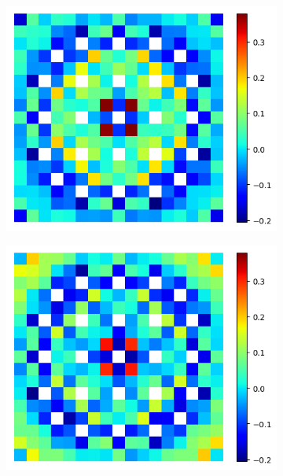 \begin{figure}[h!]
\centering
\begin{subfigure}{0.45\textwidth}
  \centering
  \includegraphics[width=\linewidth]{figures/assembly/fiss-null-errors}
  \caption{}
  \label{fig:assm-fiss-null-error}
\end{subfigure}%
\begin{subfigure}{0.45\textwidth}
  \centering
  \includegraphics[width=\linewidth]{figures/assembly/fiss-degenerate-errors}
  \caption{}
  \label{fig:assm-fiss-degen-error}
\end{subfigure}

\end{figure}
